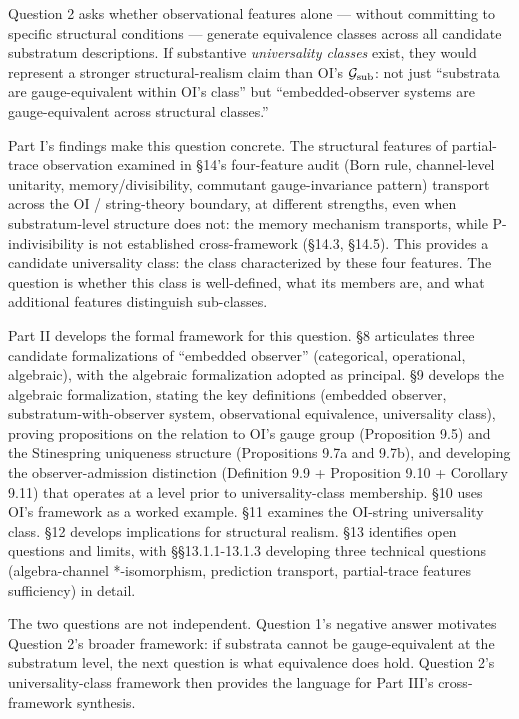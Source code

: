 \documentclass[
]{article}
\begin{document}
Question 2 asks whether observational features alone --- without
committing to specific structural conditions --- generate equivalence
classes across all candidate substratum descriptions. If substantive
\emph{universality classes} exist, they would represent a stronger
structural-realism claim than OI's \(\mathcal{G}_{\rm sub}\): not just
``substrata are gauge-equivalent within OI's class'' but
``embedded-observer systems are gauge-equivalent across structural
classes.''

Part I's findings make this question concrete. The structural features
of partial-trace observation examined in §14's four-feature audit (Born
rule, channel-level unitarity, memory/divisibility, commutant
gauge-invariance pattern) transport across the OI / string-theory
boundary, at different strengths, even when substratum-level structure
does not: the memory mechanism transports, while P-indivisibility is not
established cross-framework (§14.3, §14.5). This provides a candidate
universality class: the class characterized by these four features. The
question is whether this class is well-defined, what its members are,
and what additional features distinguish sub-classes.

Part II develops the formal framework for this question. §8 articulates
three candidate formalizations of ``embedded observer'' (categorical,
operational, algebraic), with the algebraic formalization adopted as
principal. §9 develops the algebraic formalization, stating the key
definitions (embedded observer, substratum-with-observer system,
observational equivalence, universality class), proving propositions on
the relation to OI's gauge group (Proposition 9.5) and the Stinespring
uniqueness structure (Propositions 9.7a and 9.7b), and developing the
observer-admission distinction (Definition 9.9 + Proposition 9.10 +
Corollary 9.11) that operates at a level prior to universality-class
membership. §10 uses OI's framework as a worked example. §11 examines
the OI-string universality class. §12 develops implications for
structural realism. §13 identifies open questions and limits, with
§§13.1.1-13.1.3 developing three technical questions (algebra-channel
*-isomorphism, prediction transport, partial-trace features sufficiency)
in detail.

The two questions are not independent. Question 1's negative answer
motivates Question 2's broader framework: if substrata cannot be
gauge-equivalent at the substratum level, the next question is what
equivalence does hold. Question 2's universality-class framework then
provides the language for Part III's cross-framework synthesis.
\end{document}
